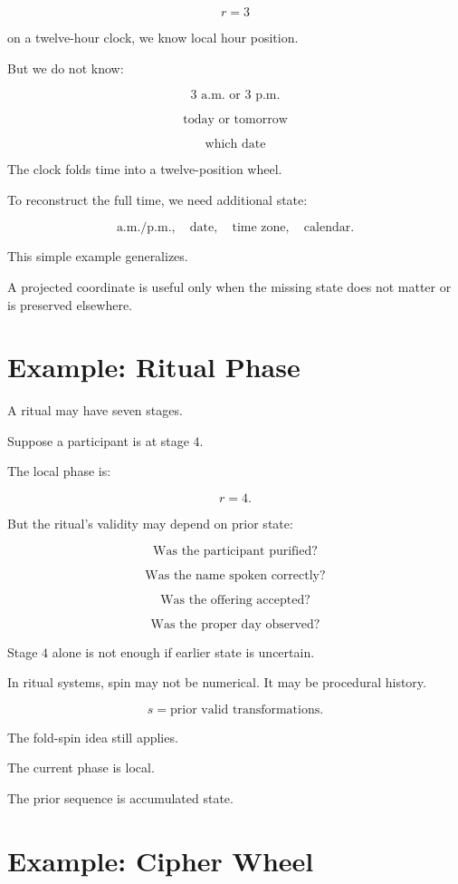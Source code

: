 \documentclass[11pt]{book}
\begin{document}
\[
r = 3
\]

on a twelve-hour clock, we know local hour position.

But we do not know:

\[
\text{3 a.m. or 3 p.m.}
\]

\[
\text{today or tomorrow}
\]

\[
\text{which date}
\]

The clock folds time into a twelve-position wheel.

To reconstruct the full time, we need additional state:

\[
\text{a.m./p.m.},
\quad
\text{date},
\quad
\text{time zone},
\quad
\text{calendar}.
\]

This simple example generalizes.

A projected coordinate is useful only when the missing state does not matter or is preserved elsewhere.

\section{Example: Ritual Phase}

A ritual may have seven stages.

Suppose a participant is at stage \(4\).

The local phase is:

\[
r=4.
\]

But the ritual's validity may depend on prior state:

\[
\text{Was the participant purified?}
\]

\[
\text{Was the name spoken correctly?}
\]

\[
\text{Was the offering accepted?}
\]

\[
\text{Was the proper day observed?}
\]

Stage \(4\) alone is not enough if earlier state is uncertain.

In ritual systems, spin may not be numerical. It may be procedural history.

\[
s = \text{prior valid transformations}.
\]

The fold-spin idea still applies.

The current phase is local.

The prior sequence is accumulated state.

\section{Example: Cipher Wheel}
\end{document}
